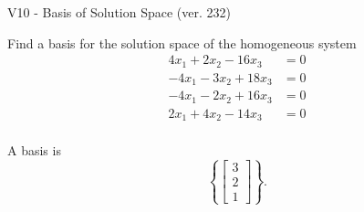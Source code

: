 \begin{exercise}
  \begin{exerciseTitle}V10 - Basis of Solution Space (ver. 232)\end{exerciseTitle}
  \begin{exerciseStatement}
    Find a basis for the solution space of the homogeneous system 
\begin{align*}
 4 x_ 1 + 2 x_ 2 -16 x_ 3 &= 0  \\ 
  -4 x_ 1 -3 x_ 2 + 18 x_ 3 &= 0  \\ 
  -4 x_ 1 -2 x_ 2 + 16 x_ 3 &= 0  \\ 
  2 x_ 1 + 4 x_ 2 -14 x_ 3 &= 0  \\ 
 \end{align*}


 
  \end{exerciseStatement}

  \begin{exerciseAnswer}
   A basis is   
\[\left\{\left[\begin{array}{c}
3 \\
2 \\
1
\end{array}\right]\right\}.\]

  


  \end{exerciseAnswer}
\end{exercise}